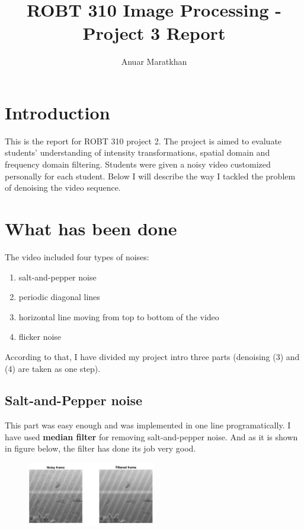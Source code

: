 \documentclass{IEEEtran}
\begin{document}
\title{ROBT 310 Image Processing - Project 3 Report}

\author{Anuar Maratkhan}

\maketitle

\section{Introduction}
This is the report for ROBT 310 project 2. The project is aimed to evaluate students' understanding of intensity transformations, spatial domain and frequency domain filtering. Students were given a noisy video customized personally for each student. Below I will describe the way I tackled the problem of denoising the video sequence.

\section{What has been done}
The video included four types of noises:
\begin{enumerate}
	\item salt-and-pepper noise
	\item periodic diagonal lines
	\item horizontal line moving from top to bottom of the video
	\item flicker noise
\end{enumerate}

According to that, I have divided my project intro three parts (denoising (3) and (4) are taken as one step).

\subsection{Salt-and-Pepper noise}
This part was easy enough and was implemented in one line programatically. I have used \textbf{median filter} for removing salt-and-pepper noise. And as it is shown in figure below, the filter has done its job very good.

\begin{figure}[h]
	\centering
	\includegraphics[width=0.5\textwidth]{1.png}
\end{figure}
\end{document}
